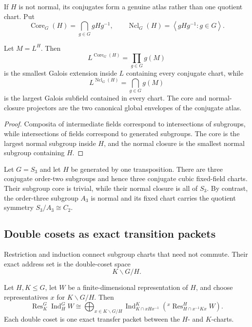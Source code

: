 If \(H\) is not normal, its conjugates form a genuine atlas rather than one quotient chart.  Put
\[
 \operatorname{Core}_G(H)=\bigcap_{g\in G}gHg^{-1},
 \qquad
 \operatorname{Ncl}_G(H)=\left\langle gHg^{-1}:g\in G\right\rangle.
\]

\begin{theorem}
\label{thm:block12-core-normal-closure}
Let \(M=L^H\).  Then
\[
 \boxed{
 L^{\operatorname{Core}_G(H)}
 =\prod_{g\in G}g(M)}
 \tag{12.6}
\]
is the smallest Galois extension inside \(L\) containing every conjugate chart, while
\[
 \boxed{
 L^{\operatorname{Ncl}_G(H)}
 =\bigcap_{g\in G}g(M)}
 \tag{12.7}
\]
is the largest Galois subfield contained in every chart.  The core and normal-closure projectors are the two canonical global envelopes of the conjugate atlas.
\end{theorem}

\begin{proof}
Composita of intermediate fields correspond to intersections of subgroups, while intersections of fields correspond to generated subgroups.  The core is the largest normal subgroup inside \(H\), and the normal closure is the smallest normal subgroup containing \(H\).
\end{proof}

\begin{example}
Let \(G=S_3\) and let \(H\) be generated by one transposition.  There are three conjugate order-two subgroups and hence three conjugate cubic fixed-field charts.  Their subgroup core is trivial, while their normal closure is all of \(S_3\).  By contrast, the order-three subgroup \(A_3\) is normal and its fixed chart carries the quotient symmetry \(S_3/A_3\cong C_2\).
\end{example}

\subsection{Double cosets as exact transition packets}
\label{subsec:block12-mackey}

Restriction and induction connect subgroup charts that need not commute.  Their exact address set is the double-coset space
\[
 K\backslash G/H.
\]

\begin{theorem}
\label{thm:block12-mackey}
Let \(H,K\leq G\), let \(W\) be a finite-dimensional representation of \(H\), and choose representatives \(x\) for \(K\backslash G/H\).  Then
\[
 \boxed{
 \operatorname{Res}_K^G\operatorname{Ind}_H^GW
 \cong
 \bigoplus_{x\in K\backslash G/H}
 \operatorname{Ind}_{K\cap xHx^{-1}}^K
 \left({}^x\operatorname{Res}_{H\cap x^{-1}Kx}^HW\right).}
 \tag{12.8}
\]
Each double coset is one exact transfer packet between the \(H\)- and \(K\)-charts.
\end{theorem}

